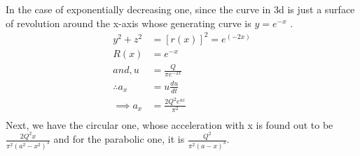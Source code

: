 \documentclass{book}
\begin{document}
In the case of exponentially decreasing one, since the curve in 3d is just a surface of revolution around the x-axis whose generating curve is $y=e^{-x}$ . \\
\begin{equation*}
\begin{split}
y^2+z^2&=[r(x)]^2=e^{(-2x)}\\  %
R(x)&=e^{-x}\\
and, u&=\frac{Q}{\pi e^{-2x}}\\
\therefore a_x&=u\frac{du}{dt}\\
\implies a_x&=\frac{2Q^2 e^{4x}}{\pi^2}\\
\end{split}
\end{equation*}
Next, we have the circular one, whose acceleration with x is found out to be $\frac{2Q^2x}{\pi^2 (a^2-x^2)^3}$ and for the parabolic one, it is $\frac{Q^2}{\pi^2 (a-x)^3}$.
\begin{center}
\end{center}
\begin{center}
\end{center}
\begin{center}
\end{center}
\begin{center}
\end{center}
\end{document}

